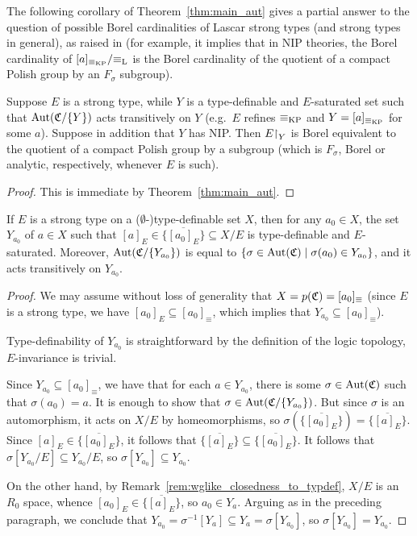 	The following corollary of Theorem~\ref{thm:main_aut} gives a partial answer to the question of possible Borel cardinalities of Lascar strong types (and strong types in general), as raised in \cite{KPS13} (for example, it implies that in NIP theories, the Borel cardinality of $[a]_{\equiv_{\mathrm{KP}}}/{\equiv_{\mathrm{L}}}$ is the Borel cardinality of the quotient of a compact Polish group by an $F_\sigma$ subgroup).
	\begin{cor}
		Suppose $E$ is a strong type, while $Y$ is a type-definable and $E$-saturated set such that $\operatorname{{Aut}}({\mathfrak C}/\{Y\})$ acts transitively on $Y$ (e.g.\ $E$ refines $\equiv_{\mathrm{KP}}$ and $Y=[a]_{\equiv_{\mathrm{KP}}}$ for some $a$). Suppose in addition that $Y$ has NIP. Then $E\mathord{\upharpoonright}_Y$ is Borel equivalent to the quotient of a compact Polish group by a subgroup (which is $F_\sigma$, Borel or analytic, respectively, whenever $E$ is such).
	\end{cor}
	\begin{proof}
		This is immediate by Theorem~\ref{thm:main_aut}.
	\end{proof}
	
	\begin{prop}
		\label{prop:closure_has_transitive_action}
		If $E$ is a strong type on a ($\emptyset$-)type-definable set $X$, then for any $a_0\in X$, the set $Y_{a_0}$ of $a\in X$ such that $[a]_E\in \overline{\{[a_0]_E\}}\subseteq X/E$ is type-definable and $E$-saturated. Moreover, $\operatorname{{Aut}}({\mathfrak C}/\{Y_{a_0}\})$ is equal to $\{\sigma\in \operatorname{{Aut}}({\mathfrak C})\mid \sigma(a_0)\in Y_{a_0} \}$, and it acts transitively on $Y_{a_0}$.
	\end{prop}
	\begin{proof}
		We may assume without loss of generality that $X=p({\mathfrak C})=[a_0]_{\equiv}$ (since $E$ is a strong type, we have $[a_0]_E\subseteq [a_0]_{\equiv}$, which implies that $Y_{a_0}\subseteq [a_0]_{\equiv}$).
		
		Type-definability of $Y_{a_0}$ is straightforward by the definition of the logic topology, $E$-invariance is trivial.
		
		Since $Y_{a_0}\subseteq [a_0]_{\equiv}$, we have that for each $a\in Y_{a_0}$, there is some $\sigma\in \operatorname{{Aut}}({\mathfrak C})$ such that $\sigma(a_0)=a$. It is enough to show that $\sigma\in \operatorname{{Aut}}({\mathfrak C}/\{Y_{a_0}\})$. But since $\sigma$ is an automorphism, it acts on $X/E$ by homeomorphisms, so $\sigma(\overline{\{[a_0]_E\}})=\overline{\{[a]_E\}}$. Since $[a]_E\in \overline{\{[a_0]_E\}}$, it follows that $\overline{\{[a]_E\}}\subseteq \overline{\{[a_0]_E\}}$.
		It follows that $\sigma[Y_{a_0}/E]\subseteq Y_{a_0}/E$, so $\sigma[Y_{a_0}]\subseteq Y_{a_0}$.
		
		
		On the other hand, by Remark~\ref{rem:wglike_closedness_to_typdef}, $X/E$ is an $R_0$ space, whence $[a_0]_E\in \overline{\{[a]_E\}}$, so $a_0\in Y_a$. Arguing as in the preceding paragraph, we conclude that $Y_{a_0}=\sigma^{-1}[Y_a]\subseteq Y_a=\sigma[Y_{a_0}]$, so $\sigma[Y_{a_0}]=Y_{a_0}$.
	\end{proof}
	
